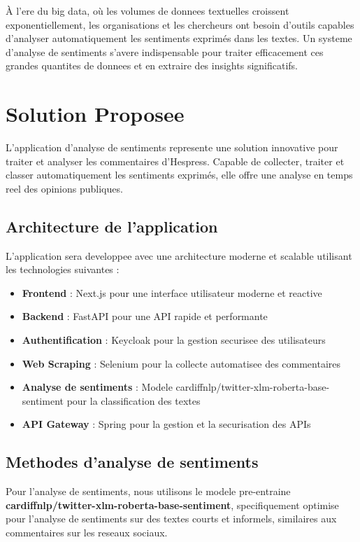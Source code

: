 À l'ere du big data, où les volumes de donnees textuelles croissent exponentiellement, les organisations et les chercheurs ont besoin d'outils capables d'analyser automatiquement les sentiments exprimés dans les textes. Un systeme d'analyse de sentiments s'avere indispensable pour traiter efficacement ces grandes quantites de donnees et en extraire des insights significatifs.

\section{Solution Proposee}

L'application d'analyse de sentiments represente une solution innovative pour traiter et analyser les commentaires d'Hespress. Capable de collecter, traiter et classer automatiquement les sentiments exprimés, elle offre une analyse en temps reel des opinions publiques.

\subsection{Architecture de l'application}

L'application sera developpee avec une architecture moderne et scalable utilisant les technologies suivantes :

\begin{itemize}
    \item \textbf{Frontend} : Next.js pour une interface utilisateur moderne et reactive
    \item \textbf{Backend} : FastAPI pour une API rapide et performante
    \item \textbf{Authentification} : Keycloak pour la gestion securisee des utilisateurs
    \item \textbf{Web Scraping} : Selenium pour la collecte automatisee des commentaires
    \item \textbf{Analyse de sentiments} : Modele cardiffnlp/twitter-xlm-roberta-base-sentiment pour la classification des textes
    \item \textbf{API Gateway} : Spring pour la gestion et la securisation des APIs
\end{itemize}

\subsection{Methodes d'analyse de sentiments}

Pour l'analyse de sentiments, nous utilisons le modele pre-entraine \textbf{cardiffnlp/twitter-xlm-roberta-base-sentiment}, specifiquement optimise pour l'analyse de sentiments sur des textes courts et informels, similaires aux commentaires sur les reseaux sociaux.

